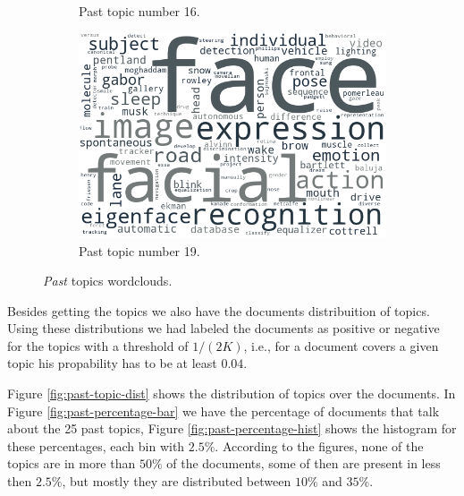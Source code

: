 \begin{figure}[h!]
\begin{subfigure}{0.49\textwidth}
		\caption{Past topic number 16.}
	\end{subfigure}%
	\hfill
	\begin{subfigure}{0.49\textwidth}
		\includegraphics[width=\linewidth]{01.Chapters/05.Results/past_19}
		\caption{Past topic number 19.}
	\end{subfigure}%
	\caption{\textit{Past} topics wordclouds.}
	\label{fig:past-wordcloud}
\end{figure}

Besides getting the topics we also have the documents distribuition of topics. Using these distributions we had labeled the documents as positive or negative for the topics with a threshold of $1 / (2 K)$, i.e., for a document covers a given topic his propability has to be at least $0.04$. 

Figure \ref{fig:past-topic-dist} shows the distribution of topics over the documents. In Figure \ref{fig:past-percentage-bar} we have the percentage of documents that talk about the 25 past topics, Figure \ref{fig:past-percentage-hist} shows the histogram for these percentages, each bin with $2.5\%$. According to the figures, none of the topics are in more than $50\%$ of the documents, some of then are present in less then $2.5\%$, but mostly they are distributed between $10\%$ and $35\%$. 

